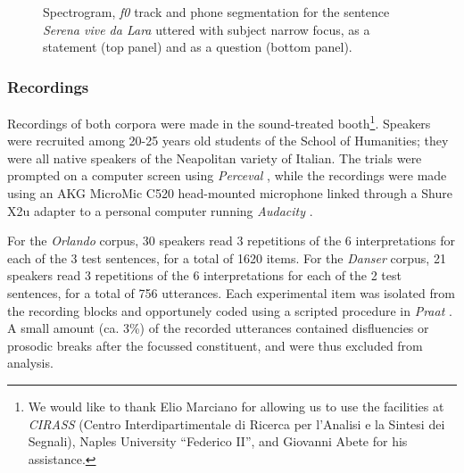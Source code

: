 \begin{figure}
\centering
{}
\caption{Spectrogram, \textit{f0} track and phone segmentation for the sentence \textit{Serena vive da Lara} uttered with subject narrow focus, as a statement (top panel) and as a question (bottom panel).}
\label{fig401}\end{figure}

\subsubsection{Recordings}\label{sec4213}
Recordings of both corpora were made in the sound-treated booth\footnote{We would like to thank Elio Marciano for allowing us to use the facilities at \textit{CIRASS} (Centro Interdipartimentale di Ricerca per l'Analisi e la Sintesi dei Segnali), Naples University ``Federico II'', and Giovanni Abete for his assistance.}. Speakers were recruited among 20-25 years old students of the School of Humanities; they were all native speakers of the Neapolitan variety of Italian. The trials were prompted on a computer screen using \textit{Perceval} \citep{andre2003perceval}, while the recordings were made using an AKG MicroMic C520 head-mounted microphone linked through a Shure X2u adapter to a personal computer running \textit{Audacity} \citep{audacity2006audacity}. 

For the \textit{Orlando} corpus, 30 speakers read 3 repetitions of the 6 interpretations for each of the 3 test sentences, for a total of 1620 items. For the \textit{Danser} corpus, 21 speakers read 3 repetitions of the 6 interpretations for each of the 2 test sentences, for a total of 756 utterances. Each experimental item was isolated from the recording blocks and opportunely coded using a scripted procedure in \textit{Praat} \citep{boersma2008praat}. A small amount (ca. 3\%) of the recorded utterances contained disfluencies or prosodic breaks after the focussed constituent, and were thus excluded from analysis. 

